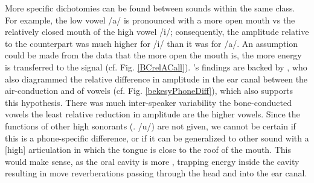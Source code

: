 More specific dichotomies can be found between sounds within the same class. For example, the low vowel /a/ is pronounced with a more open mouth vs the relatively closed mouth of the high vowel /i/; consequently, the \DIFdelbegin {}\DIFdelend \DIFaddbegin {}\DIFaddend amplitude relative to the \DIFdelbegin {}\DIFdelend \DIFaddbegin {}\DIFaddend counterpart was much higher for /i/ than it was for /a/. An assumption could be made from the data that the more open the mouth is, the more energy is transferred to the \DIFdelbegin {}\DIFdelend \DIFaddbegin {}\DIFaddend signal (cf. Fig. \ref{BCrelACall}). \cite{reinfeldt:10}'s findings are backed by \cite{bekesy:60}, who also diagrammed the relative difference in amplitude in the ear canal between the air-conduction and \DIFdelbegin {}\DIFdelend \DIFaddbegin {}\DIFaddend of vowels (cf. Fig. \ref{bekesyPhoneDiff}), which also supports this hypothesis.  There was much inter-speaker variability \DIFdelbegin {}\DIFdelend \DIFaddbegin {}\DIFaddend the bone-conducted vowels \DIFdelbegin {}\DIFdelend \DIFaddbegin {}\DIFaddend the least relative reduction in amplitude are the higher vowels.  Since the functions of other high sonorants (\DIFdelbegin {}\DIFdelend \DIFaddbegin {}\DIFaddend . /u/) are not given, we cannot be certain if this is a phone-specific difference, or if it can be generalized to other sound with a [high] articulation in which the tongue is close to the roof of the mouth.  This \DIFaddbegin {}\DIFaddend would make sense, as the oral cavity is more \DIFdelbegin {}\DIFdelend \DIFaddbegin {}\DIFaddend , trapping energy inside the cavity resulting in move reverberations passing through the head and into the ear canal.
%
